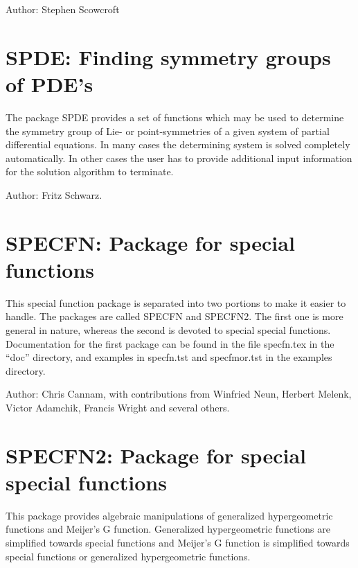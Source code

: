Author: Stephen Scowcroft



\newpage

\section{SPDE: Finding symmetry groups of {PDE}'s}

\label{package:SPDE}

The package SPDE provides a set of functions which may be used to
determine the symmetry group of Lie- or point-symmetries of a given system
of partial differential equations. In many cases the determining system is
solved completely automatically. In other cases the user has to provide
additional input information for the solution algorithm to terminate.

Author: Fritz Schwarz.



\newpage

\section{SPECFN: Package for special functions} 

This special function package is separated into two portions to make it
easier to handle.  The packages are called SPECFN and SPECFN2.  The first
one is more general in nature, whereas the second is devoted to special
special functions.  Documentation for the first package can be found in
the file specfn.tex in the ``doc'' directory, and examples in specfn.tst
and specfmor.tst in the examples directory.

Author:  Chris Cannam, with contributions from Winfried Neun, Herbert
Melenk, Victor Adamchik, Francis Wright and several others.



\section{SPECFN2: Package for special special functions} 


This package provides algebraic manipulations of generalized
hypergeometric functions and Meijer's G function.  Generalized
hypergeometric functions are simplified towards special functions and
Meijer's G function is simplified towards special functions or generalized
hypergeometric functions.

